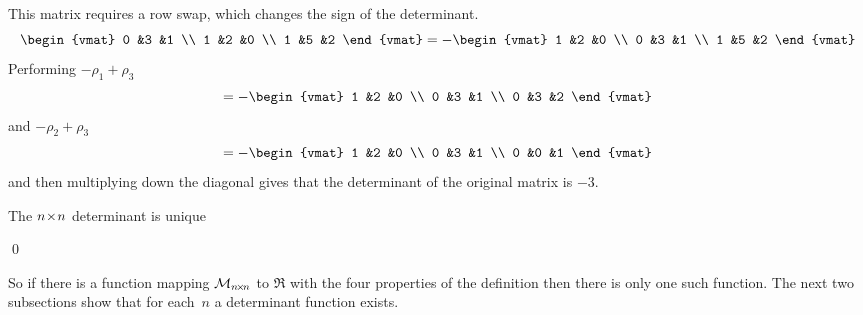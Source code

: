 \documentclass[10pt,t,serif,professionalfont]{beamer}
\begin{document}
\begin{frame}
\ex
This matrix requires a row swap, which changes the sign of the determinant.
\begin{equation*}
  \begin{vmat}
    0  &3  &1 \\
    1  &2  &0 \\
    1  &5  &2
  \end{vmat}
  =
  -\begin{vmat}
    1  &2  &0 \\
    0  &3  &1 \\
    1  &5  &2
  \end{vmat}
\end{equation*}
Performing $-\rho_1+\rho_3$
\begin{equation*}
  =-\begin{vmat}
    1  &2  &0 \\
    0  &3  &1 \\
    0  &3  &2
  \end{vmat}
\end{equation*}
and $-\rho_2+\rho_3$
\begin{equation*}
  =-\begin{vmat}
    1  &2  &0 \\
    0  &3  &1 \\
    0  &0  &1
  \end{vmat}
\end{equation*}
and then multiplying down the diagonal gives that the determinant
of the original matrix is $-3$.
\end{frame}



\begin{frame}{The $n \! \times \! n$ determinant is unique}
\lm[lm:DetFcnIsUnique]

\pause 
\pf 
{}
\qed

\pause
\medskip
So if there is a function mapping $\mathcal{M}_{n \! \times \! n}$ to $\Re$ with 
the four properties of the definition then there is only one such
function.
The next two subsections show that for each~$n$ a determinant function 
exists.
\end{frame}



\end{document}
